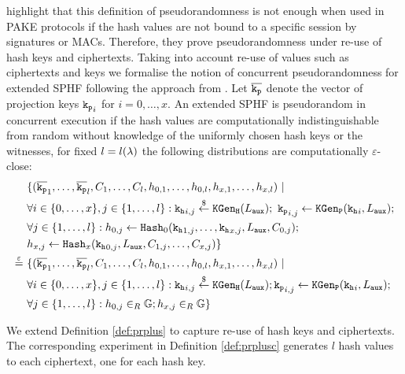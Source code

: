 \noindent
\citet{Katz2011} highlight that this definition of pseudorandomness is not enough when used in PAKE protocols if the hash values are not bound to a specific session by signatures or \acp{MAC}.
Therefore, they prove pseudorandomness under re-use of hash keys and ciphertexts.
Taking into account re-use of \SPHFF values such as ciphertexts and keys we formalise the notion of concurrent pseudorandomness for extended \ac{SPHF} following the approach from \citet{Katz2011}.
Let $\overline{\mathtt{k_p}}$ denote the vector of projection keys $\mathtt{k_p}_i$ for $i=0,\dots,x$.
An extended \ac{SPHF} is pseudorandom in concurrent execution if the hash values are computationally indistinguishable from random without knowledge of the uniformly chosen hash keys or the witnesses, \ie for fixed $l=l(\lambda)$ the following distributions are computationally $\varepsilon$-close:
\begin{align*}
& \{(\overline{\mathtt{k_p}}_1,\dots,\overline{\mathtt{k_p}}_l,C_1,\dots,C_l,h_{0,1},\dots, h_{0,l},h_{x,1},\dots, h_{x,l}) ~|~ \\
&  \forall i\in\{0,\dots, x\}, j\in\{1,\dots,l\}: \mathtt{k_h}_{i,j}\stackrel{\$}{\gets}\mathtt{KGen_H}(L_\mathtt{aux});~ \mathtt{k_p}_{i,j}\gets\mathtt{KGen_P}(\mathtt{k_h}_i,L_\mathtt{aux}); \\
&  \forall j\in\{1,\dots,l\}: h_{0,j}\gets\mathtt{Hash}_0(\mathtt{k_h}_{1,j},\dots,\mathtt{k_h}_{x,j},L_\mathtt{aux},C_{0,j}); \\
&  h_{x,j}\gets\mathtt{Hash}_x(\mathtt{k_h}_{0,j}, L_\mathtt{aux},C_{1,j},\dots,C_{x,j})\} \\
\stackrel{\varepsilon}{=}~ & \{(\overline{\mathtt{k_p}}_1,\dots,\overline{\mathtt{k_p}}_l,C_1,\dots,C_l,h_{0,1},\dots, h_{0,l},h_{x,1},\dots, h_{x,l}) ~|~ \\
&  \forall i\in\{0,\dots, x\}, j\in\{1,\dots,l\}: \mathtt{k_h}_{i,j}\stackrel{\$}{\gets}\mathtt{KGen_H}(L_\mathtt{aux}); \mathtt{k_p}_{i,j}\gets\mathtt{KGen_P}(\mathtt{k_h}_i,L_\mathtt{aux}); \\
&  \forall j\in\{1,\dots,l\}: h_{0,j}\in_R\mathbb{G}; h_{x,j}\in_R\mathbb{G}\}
\end{align*}

\noindent
We extend Definition \ref{def:prplus} to capture re-use of hash keys and ciphertexts.
The corresponding experiment in Definition \ref{def:prplusc}
generates $l$ hash values to each ciphertext, one for each hash key.

